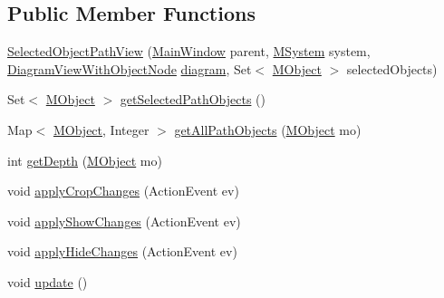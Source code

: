 \subsection*{Public Member Functions}
\begin{DoxyCompactItemize}
\item 
\hyperlink{classorg_1_1tzi_1_1use_1_1gui_1_1views_1_1selection_1_1objectselection_1_1_selected_object_path_view_afaf777a3c22b46a4cdb39bfc68491067}{Selected\-Object\-Path\-View} (\hyperlink{classorg_1_1tzi_1_1use_1_1gui_1_1main_1_1_main_window}{Main\-Window} parent, \hyperlink{classorg_1_1tzi_1_1use_1_1uml_1_1sys_1_1_m_system}{M\-System} system, \hyperlink{classorg_1_1tzi_1_1use_1_1gui_1_1views_1_1diagrams_1_1_diagram_view_with_object_node}{Diagram\-View\-With\-Object\-Node} \hyperlink{classorg_1_1tzi_1_1use_1_1gui_1_1views_1_1selection_1_1_object_selection_view_a3aab89dd6fcf330a0095e90ac047f196}{diagram}, Set$<$ \hyperlink{interfaceorg_1_1tzi_1_1use_1_1uml_1_1sys_1_1_m_object}{M\-Object} $>$ selected\-Objects)
\item 
Set$<$ \hyperlink{interfaceorg_1_1tzi_1_1use_1_1uml_1_1sys_1_1_m_object}{M\-Object} $>$ \hyperlink{classorg_1_1tzi_1_1use_1_1gui_1_1views_1_1selection_1_1objectselection_1_1_selected_object_path_view_a1eff0e12981ddd61d7f5272404565e0b}{get\-Selected\-Path\-Objects} ()
\item 
Map$<$ \hyperlink{interfaceorg_1_1tzi_1_1use_1_1uml_1_1sys_1_1_m_object}{M\-Object}, Integer $>$ \hyperlink{classorg_1_1tzi_1_1use_1_1gui_1_1views_1_1selection_1_1objectselection_1_1_selected_object_path_view_a243c8dfe08ca3b194c9750df8f18a8c2}{get\-All\-Path\-Objects} (\hyperlink{interfaceorg_1_1tzi_1_1use_1_1uml_1_1sys_1_1_m_object}{M\-Object} mo)
\item 
int \hyperlink{classorg_1_1tzi_1_1use_1_1gui_1_1views_1_1selection_1_1objectselection_1_1_selected_object_path_view_a4401d41b70dc8a3061ddce3f88657229}{get\-Depth} (\hyperlink{interfaceorg_1_1tzi_1_1use_1_1uml_1_1sys_1_1_m_object}{M\-Object} mo)
\item 
void \hyperlink{classorg_1_1tzi_1_1use_1_1gui_1_1views_1_1selection_1_1objectselection_1_1_selected_object_path_view_a824a88400753b03e6d5fed854dd37c56}{apply\-Crop\-Changes} (Action\-Event ev)
\item 
void \hyperlink{classorg_1_1tzi_1_1use_1_1gui_1_1views_1_1selection_1_1objectselection_1_1_selected_object_path_view_a8d0678ee5835a87ff45e7f03eea9612d}{apply\-Show\-Changes} (Action\-Event ev)
\item 
void \hyperlink{classorg_1_1tzi_1_1use_1_1gui_1_1views_1_1selection_1_1objectselection_1_1_selected_object_path_view_a0f060e901a4ad7bbe63a437549d223b4}{apply\-Hide\-Changes} (Action\-Event ev)
\item 
void \hyperlink{classorg_1_1tzi_1_1use_1_1gui_1_1views_1_1selection_1_1objectselection_1_1_selected_object_path_view_ac67fc91864ffa49aae78c8b4a23295bb}{update} ()
\end{DoxyCompactItemize}
